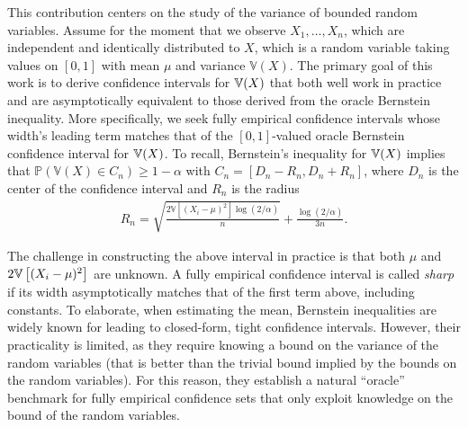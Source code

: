 This contribution centers on the study of the variance of bounded random variables. Assume for the moment that we observe $X_1, \ldots, X_n$, which are independent and identically distributed to $X$, which is a random variable taking values on $[0, 1]$ with mean $\mu$ and variance $\mathbb{V}(X)$.
The primary goal of this work is to derive confidence intervals for $\mathbb{V}(X)$ that both well work in practice and are asymptotically equivalent to those derived from the oracle Bernstein inequality. More specifically, we seek fully empirical confidence intervals whose width's leading term matches that of the $[0,1]$-valued oracle Bernstein confidence interval for $\mathbb{V}(X)$. To recall, Bernstein's inequality for $\mathbb{V}(X)$ implies that $\mathbb{P}(\mathbb{V}(X) \in C_n) \geq 1 - \alpha$ with $C_n = [D_n - R_n, D_n + R_n]$, where $D_n$ is the center of the confidence interval and $R_n$ is the radius 
\begin{align*}
    R_n = \sqrt{\frac{2 \mathbb{V}[(X_i - \mu)^2] \log(2/\alpha)}{n}} + \frac{\log(2/\alpha)}{3n}.
\end{align*}



 

 The challenge in constructing the above interval in practice is that both $\mu$ and $2 \mathbb{V} \left[ (X_i-\mu)^2\right]$ are unknown. 
 A fully empirical confidence interval is called \textit{sharp} if its width asymptotically matches that of the first term above, including constants. To elaborate, when estimating the mean, Bernstein inequalities \citep{bernstein_theory_1927, bennett1962probability} are widely known for leading to closed-form, tight confidence intervals. However, their practicality is limited, as they require knowing a bound on the variance of the random variables (that is better than the trivial bound implied by the  bounds on the random variables). For this reason, they establish a natural ``oracle'' benchmark for fully empirical confidence sets that only exploit knowledge on the bound of the random variables. 



